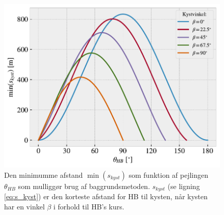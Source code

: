 \documentclass[%
 reprint,
nofootinbib,
aps,
]{revtex4-1}
\begin{document}
\begin{figure}[H]
  \includegraphics[width=\linewidth]{figures/limit_coastdis.pdf}
  \caption{Den minimumme afstand $\min{(s_{kyst})}$ som funktion af pejlingen $\theta_{HB}$ som mulliggør brug af baggrundsmetoden. $s_{kyst}$ (se ligning \ref{eq:s_kyst}) er den korteste afstand for HB til kysten, når kysten har en vinkel $\beta$ i forhold til HB's kurs.}
  \label{fig:limit_coastdis}
\end{figure}
\end{document}
